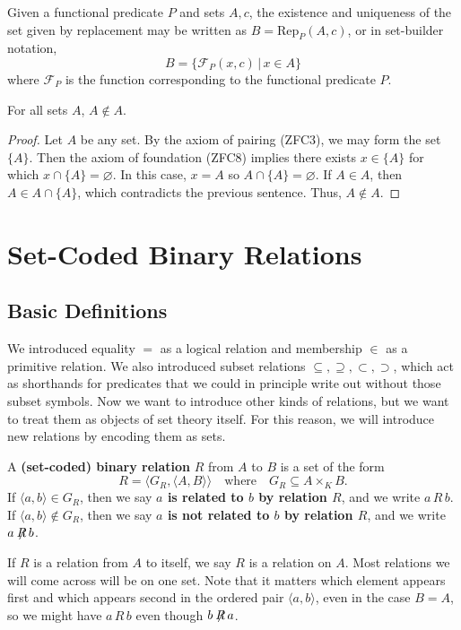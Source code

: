Given a functional predicate $P$ and sets $A, c$, the existence and uniqueness of the set given by replacement may be written as $B = \textrm{Rep}_{P}(A, c)$, or in set-builder notation,
\[ B = \{ \mathcal{F}_{P}(x, c) \,|\, x\in A \} \]
where $\mathcal{F}_{P}$ is the function corresponding to the functional predicate $P$. 

\begin{prop}
	For all sets $A$, $A\notin A$. 
\end{prop}
\begin{proof}
	Let $A$ be any set. 
	By the axiom of pairing (ZFC3), we may form the set $\{A\}$. 
	Then the axiom of foundation (ZFC8) implies there exists $x\in\{A\}$ for which $x\cap \{A\} = \varnothing$.
	In this case, $x = A$ so $A\cap\{A\} = \varnothing$. 
	If $A\in A$, then $A\in A\cap\{A\}$, which contradicts the previous sentence.
	Thus, $A\notin A$.
\end{proof}

\section{Set-Coded Binary Relations}\label{ch1sec_rels}

\subsection{Basic Definitions}

We introduced equality $=$ as a logical relation and membership $\in$ as a primitive relation. 
We also introduced subset relations $\subseteq, \supseteq, \subset, \supset$, which act as shorthands for predicates that we could in principle write out without those subset symbols. 
Now we want to introduce other kinds of relations, but we want to treat them as objects of set theory itself. 
For this reason, we will introduce new relations by encoding them as sets. 

\begin{definition}
	A \textbf{(set-coded) binary relation} $R$ from $A$ to $B$ is a set of the form
	\[ R = \langle G_{R}, \langle A, B\rangle\rangle \quad\text{where}\quad G_{R}\subseteq A\times_{K} B. \]
	If $\langle a, b\rangle\in G_{R}$, then we say \textbf{$a$ is related to $b$ by relation $R$}, and we write $a\, R\, b$.
	If $\langle a, b\rangle\notin G_{R}$, then we say \textbf{$a$ is not related to $b$ by relation $R$}, and we write $a \not\!\! R\, b$.
\end{definition}

If $R$ is a relation from $A$ to itself, we say $R$ is a relation on $A$. 
Most relations we will come across will be on one set. 
Note that it matters which element appears first and which appears second in the ordered pair $\langle a, b\rangle$, even in the case $B = A$, so we might have $a\, R\, b$ even though $b \not\!\! R\, a$.


